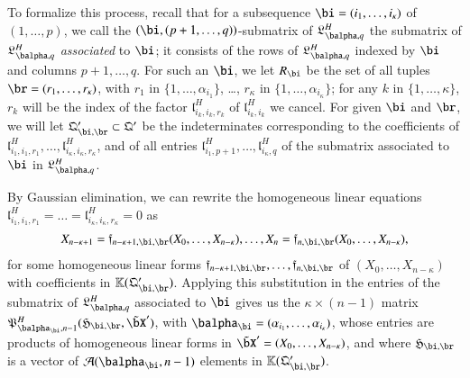 \documentclass[amsthm]{elsart}
\begin{document}
To formalize this process, recall that for a subsequence
$\bi=(i_1,\dots,i_\kappa)$ of $(1,\dots,p)$, we call the
$(\bi,(p+1,\dots,q))$-submatrix of $\mathfrak{L}^H_{\balpha,q}$ the submatrix of
$\mathfrak{L}^H_{\balpha,q}$ {\em associated} to $\bi$; it consists of the rows of
$\mathfrak{L}^H_{\balpha,q}$ indexed by $\bi$ and columns $p+1,\dots,q$.
For such an $\bi$, we let $R_\bi$ be the set of
all tuples $\br=(r_1,\dots,r_\kappa)$, with $r_1$ in
$\{1,\dots,\alpha_{i_1}\}$, \dots, $r_\kappa$ in
$\{1,\dots,\alpha_{i_\kappa}\}$; for any $k$ in $\{1,\dots,\kappa\}$,
$r_k$ will be the index of the factor $\mathfrak{l}^H_{i_k,i_k,r_k}$
of $\mathfrak{l}^H_{i_k,i_k}$ we cancel. For given $\bi$ and $\br$,
we will let $\mathfrak{Q}'_{\bi,\br} \subset \mathfrak{Q}'$ be the
indeterminates corresponding to the coefficients of
$\mathfrak{l}^H_{i_1,i_1,r_1},\dots,\mathfrak{l}^H_{i_\kappa,i_\kappa,r_\kappa}$, and
of all entries $\mathfrak{l}^H_{i_1,p+1},\dots,\mathfrak{l}^H_{i_\kappa,q}$
of the submatrix associated to $\bi$ in $\mathfrak{L}^H_{\balpha,q}$.

By Gaussian elimination, we can rewrite the homogeneous linear
equations
$\mathfrak{l}^H_{i_1,i_1,r_1}=\dots=\mathfrak{l}^H_{i_\kappa,i_\kappa,r_\kappa}=0$ as
\begin{align}\label{eq:f_sr}
X_{n-\kappa+1}=\mathfrak{f}_{n-\kappa+1,\bi,\br}(X_0,\dots,X_{n-\kappa}),\dots,X_{n}=\mathfrak{f}_{n,\bi,\br}(X_0,\dots,X_{n-\kappa}),  
\end{align}
for some homogeneous linear forms
$\mathfrak{f}_{n-\kappa+1,\bi,\br},\dots,\mathfrak{f}_{n,\bi,\br}$ of
$(X_0,\dots,X_{n-\kappa})$ with coefficients in
$\KK(\mathfrak{Q}'_{\bi,\br})$. Applying this substitution in the
entries of the submatrix of ${\mathfrak{L}^H_{\balpha,q}}$ associated
to $\bi$ gives us the $\kappa \times (n-1)$ matrix
$\mathfrak{P}^H_{\balpha_\bi,n-1}(\mathfrak{H}_{\bi,\br},\tilde\bX')$,
with $\balpha_\bi=(\alpha_{i_1},\dots,\alpha_{i_\kappa})$, whose
entries are products of homogeneous linear forms in
$\tilde\bX'=(X_0,\dots,X_{n-\kappa})$, and where $\mathfrak{H}_{\bi,\br}$ is a
vector of ${\cal A}(\balpha_\bi,n-1)$ elements in $\KK(\mathfrak{Q}'_{\bi,\br})$.
\end{document}
